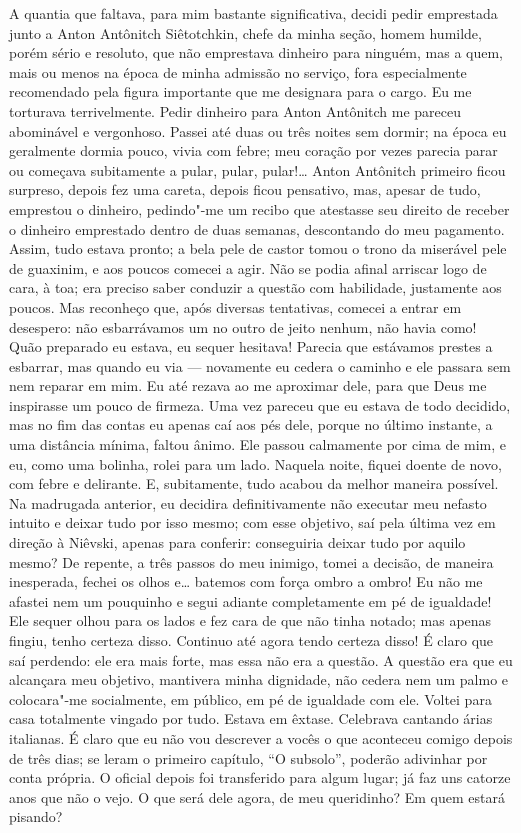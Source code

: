 A quantia que faltava, para mim bastante significativa, decidi pedir
emprestada junto a Anton Antônitch Siêtotchkin, chefe da minha seção,
homem humilde, porém sério e resoluto, que não emprestava dinheiro para
ninguém, mas a quem, mais ou menos na época de minha admissão no
serviço, fora especialmente recomendado pela figura importante que me
designara para o cargo. Eu me torturava terrivelmente. Pedir dinheiro
para Anton Antônitch me pareceu abominável e vergonhoso. Passei até
duas ou três noites sem dormir; na época eu geralmente dormia pouco,
vivia com febre; meu coração por vezes parecia parar ou começava
subitamente a pular, pular, pular!\ldots{} Anton Antônitch primeiro ficou
surpreso, depois fez uma careta, depois ficou pensativo, mas, apesar de
tudo, emprestou o dinheiro, pedindo"-me um recibo que atestasse seu
direito de receber o dinheiro emprestado dentro de duas semanas,
descontando do meu pagamento. Assim, tudo estava pronto; a bela pele de
castor tomou o trono da miserável pele de guaxinim, e aos poucos
comecei a agir. Não se podia afinal arriscar logo de cara, à toa; era
preciso saber conduzir a questão com habilidade, justamente aos poucos.
Mas reconheço que, após diversas tentativas, comecei a entrar em
desespero: não esbarrávamos um no outro de jeito nenhum, não havia
como! Quão preparado eu estava, eu sequer hesitava! Parecia que
estávamos prestes a esbarrar, mas quando eu via --- novamente eu cedera o
caminho e ele passara sem nem reparar em mim. Eu até rezava ao me     
aproximar dele, para que Deus me inspirasse um pouco de firmeza. Uma
vez pareceu que eu estava de todo decidido, mas no fim das contas eu
apenas caí aos pés dele, porque no último instante, a uma distância
mínima, faltou ânimo. Ele passou calmamente por cima de mim, e eu, como
uma bolinha, rolei para um lado. Naquela noite, fiquei doente de novo,
com febre e delirante. E, subitamente, tudo acabou da melhor maneira
possível. Na madrugada anterior, eu decidira definitivamente não
executar meu nefasto intuito e deixar tudo por isso mesmo; com esse
objetivo, saí pela última vez em direção à Niêvski, apenas para
conferir: conseguiria deixar tudo por aquilo mesmo? De repente, a três
passos do meu inimigo, tomei a decisão, de maneira inesperada, fechei
os olhos e\ldots{} batemos com força ombro a ombro! Eu não me afastei nem um
pouquinho e segui adiante completamente em pé de igualdade! Ele sequer
olhou para os lados e fez cara de que não tinha notado; mas apenas
fingiu, tenho certeza disso. Continuo até agora tendo certeza disso! É
claro que saí perdendo: ele era mais forte, mas essa não era a questão.
A questão era que eu alcançara meu objetivo, mantivera minha dignidade,
não cedera nem um palmo e colocara"-me socialmente, em público, em pé de
igualdade com ele. Voltei para casa totalmente vingado por tudo. Estava
em êxtase. Celebrava cantando árias italianas. É claro que eu não vou
descrever a vocês o que aconteceu comigo depois de três dias; se leram
o primeiro capítulo, ``O subsolo'', poderão adivinhar por conta própria.
O oficial depois foi transferido para algum lugar; já faz uns catorze
anos que não o vejo. O que será dele agora, de meu queridinho? Em quem
estará pisando?




